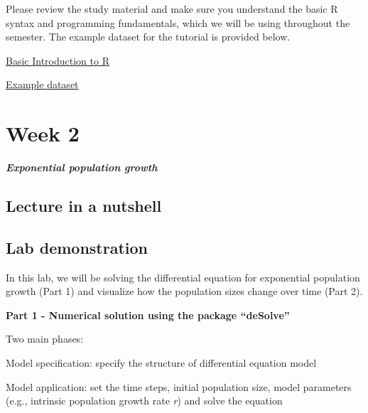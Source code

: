 \documentclass[
]{book}
\begin{document}
Please review the study material and make sure you understand the basic R syntax and programming fundamentals, which we will be using throughout the semester. The example dataset for the tutorial is provided below.

\href{./Assignments/Week1_Basic\%20Introduction\%20to\%20R.pdf}{Basic Introduction to R}

\href{./Assignments/example_dat.txt}{Example dataset}

\hypertarget{week-2}{%
\chapter*{Week 2}\label{week-2}}

\textbf{\emph{Exponential population growth}}

\hypertarget{lecture-in-a-nutshell-1}{%
\section*{Lecture in a nutshell}\label{lecture-in-a-nutshell-1}}

\hypertarget{lab-demonstration-1}{%
\section*{Lab demonstration}\label{lab-demonstration-1}}

In this lab, we will be solving the differential equation for exponential population growth (Part 1) and visualize how the population sizes change over time (Part 2).

\textbf{Part 1 - Numerical solution using the package ``deSolve''}

Two main phases:

\protect\hypertarget{aaa}{}{Model specification: specify the structure of differential equation model}

\protect\hypertarget{bbb}{}{Model application: set the time steps, initial population size, model parameters (e.g., intrinsic population growth rate \emph{r}) and solve the equation}
\end{document}
